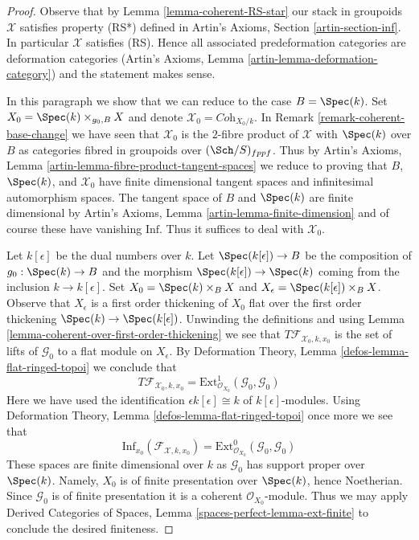 \begin{proof}
Observe that by Lemma \ref{lemma-coherent-RS-star}
our stack in groupoids $\mathcal{X}$ satisfies property (RS*)
defined in Artin's Axioms, Section \ref{artin-section-inf}.
In particular $\mathcal{X}$ satisfies (RS).
Hence all associated predeformation
categories are deformation categories
(Artin's Axioms, Lemma \ref{artin-lemma-deformation-category})
and the statement makes sense.

\medskip\noindent
In this paragraph we show that we can reduce to the case $B = \Spec(k)$.
Set $X_0 = \Spec(k) \times_{g_0, B} X$
and denote $\mathcal{X}_0 = \textit{Coh}_{X_0/k}$. In
Remark \ref{remark-coherent-base-change} we have seen that
$\mathcal{X}_0$ is the $2$-fibre product of $\mathcal{X}$ with
$\Spec(k)$ over $B$ as categories fibred in groupoids over
$(\Sch/S)_{fppf}$. Thus by
Artin's Axioms, Lemma \ref{artin-lemma-fibre-product-tangent-spaces}
we reduce to proving that $B$, $\Spec(k)$, and $\mathcal{X}_0$
have finite dimensional tangent spaces and infinitesimal automorphism
spaces. The tangent space of $B$ and $\Spec(k)$ are finite dimensional by
Artin's Axioms, Lemma \ref{artin-lemma-finite-dimension}
and of course these have vanishing $\text{Inf}$.
Thus it suffices to deal with $\mathcal{X}_0$.

\medskip\noindent
Let $k[\epsilon]$ be the dual numbers over $k$.
Let $\Spec(k[\epsilon]) \to B$ be the composition of $g_0 : \Spec(k) \to B$
and the morphism $\Spec(k[\epsilon]) \to \Spec(k)$
coming from the inclusion $k \to k[\epsilon]$.
Set $X_0 = \Spec(k) \times_B X$ and
$X_\epsilon = \Spec(k[\epsilon]) \times_B X$.
Observe that $X_\epsilon$ is a first order thickening of $X_0$
flat over the first order thickening $\Spec(k) \to \Spec(k[\epsilon])$.
Unwinding the definitions and using
Lemma \ref{lemma-coherent-over-first-order-thickening}
we see that $T\mathcal{F}_{\mathcal{X}_0, k, x_0}$ is the set of
lifts of $\mathcal{G}_0$ to a flat module on $X_\epsilon$.
By Deformation Theory, Lemma \ref{defos-lemma-flat-ringed-topoi}
we conclude that
$$
T\mathcal{F}_{\mathcal{X}_0, k, x_0} =
\text{Ext}^1_{\mathcal{O}_{X_0}}(\mathcal{G}_0, \mathcal{G}_0)
$$
Here we have used the identification $\epsilon k[\epsilon] \cong k$
of $k[\epsilon]$-modules. Using
Deformation Theory, Lemma \ref{defos-lemma-flat-ringed-topoi}
once more we see that
$$
\text{Inf}_{x_0}(\mathcal{F}_{\mathcal{X}, k, x_0}) =
\text{Ext}^0_{\mathcal{O}_{X_0}}(\mathcal{G}_0, \mathcal{G}_0)
$$
These spaces are finite dimensional over $k$ as $\mathcal{G}_0$
has support proper over $\Spec(k)$. Namely, $X_0$ is of finite presentation
over $\Spec(k)$, hence Noetherian. Since $\mathcal{G}_0$ is of finite
presentation it is a coherent $\mathcal{O}_{X_0}$-module. Thus we may apply
Derived Categories of Spaces, Lemma
\ref{spaces-perfect-lemma-ext-finite}
to conclude the desired finiteness.
\end{proof}

